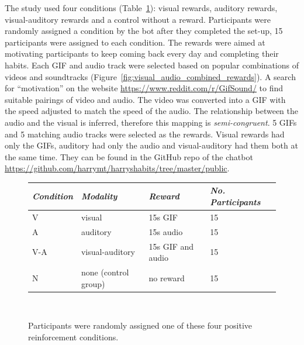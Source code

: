 The study used four conditions (Table~\ref{table:precise_rewards}): visual rewards, auditory rewards, visual-auditory rewards and a control without a reward. Participants were randomly assigned a condition by the bot after they completed the set-up, 15 participants were assigned to each condition. The rewards were aimed at motivating participants to keep coming back every day and completing their habits. Each GIF and audio track were selected based on popular combinations of videos and soundtracks (Figure~\ref{fig:visual_audio_combined_rewards}). A search for ``motivation'' on the website \url{https://www.reddit.com/r/GifSound/} to find suitable pairings of video and audio. The video was converted into a GIF with the speed adjusted to match the speed of the audio. The relationship between the audio and the visual is inferred, therefore this mapping is \textit{semi-congruent}. 5 GIFs and 5 matching audio tracks were selected as the rewards. Visual rewards had only the GIFs, auditory had only the audio and visual-auditory had them both at the same time. They can be found in the GitHub repo of the chatbot \url{https://github.com/harrymt/harryshabits/tree/master/public}.

\begin{figure}[H]
  \centering
  \begin{tabular}{l l l l}
    {\small \textit{Condition}} & {\small\textit{Modality}} & {\small \textit{Reward}} & {\small \textit{No. Participants}}  \\ \hline
    V & visual & 15s GIF & 15 \\
    A & auditory & 15s audio & 15 \\
    V-A & visual-auditory & 15s GIF and audio & 15 \\
    N & none (control group) & no reward & 15 \\
  \end{tabular}
  \caption{Participants were randomly assigned one of these four positive reinforcement conditions.}~\label{table:precise_rewards}
\end{figure}

